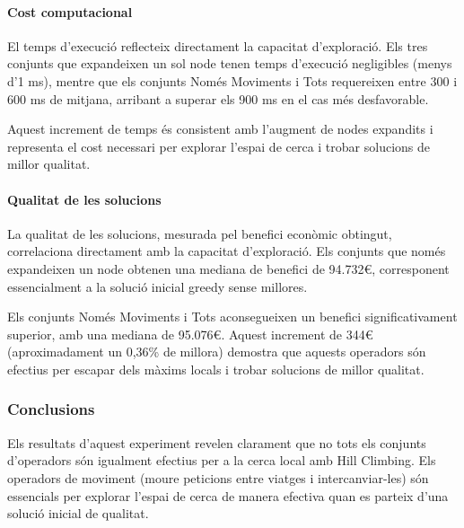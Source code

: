 \paragraph{Cost computacional}

\vspace{0.5cm}

\vspace{0.5cm}

El temps d'execució reflecteix directament la capacitat d'exploració. Els tres conjunts que expandeixen un sol node tenen temps d'execució negligibles (menys d'1 ms), mentre que els conjunts Només Moviments i Tots requereixen entre 300 i 600 ms de mitjana, arribant a superar els 900 ms en el cas més desfavorable.

Aquest increment de temps és consistent amb l'augment de nodes expandits i representa el cost necessari per explorar l'espai de cerca i trobar solucions de millor qualitat.

\paragraph{Qualitat de les solucions}

\vspace{0.5cm}

\vspace{0.5cm}

La qualitat de les solucions, mesurada pel benefici econòmic obtingut, correlaciona directament amb la capacitat d'exploració. Els conjunts que només expandeixen un node obtenen una mediana de benefici de 94.732€, corresponent essencialment a la solució inicial greedy sense millores.

Els conjunts Només Moviments i Tots aconsegueixen un benefici significativament superior, amb una mediana de 95.076€. Aquest increment de 344€ (aproximadament un 0,36\% de millora) demostra que aquests operadors són efectius per escapar dels màxims locals i trobar solucions de millor qualitat.

\subsubsection{Conclusions}

Els resultats d'aquest experiment revelen clarament que no tots els conjunts d'operadors són igualment efectius per a la cerca local amb Hill Climbing. Els operadors de moviment (moure peticions entre viatges i intercanviar-les) són essencials per explorar l'espai de cerca de manera efectiva quan es parteix d'una solució inicial de qualitat.

